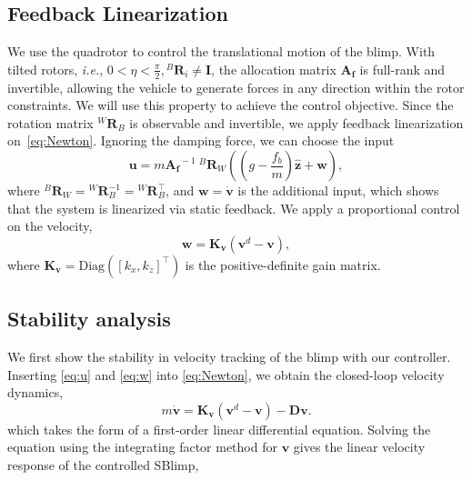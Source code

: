 \documentclass[conference]{ieeeconf}
\begin{document}
\subsection{Feedback Linearization}
We use the quadrotor to control the translational motion of the blimp.
With tilted rotors, \textit{i.e.}, $0<\eta<\frac{\pi}{2}, {}^{B}\!\boldsymbol{R}_{i}\neq\boldsymbol{I}$, the allocation matrix $\boldsymbol{A_f}$ is full-rank and invertible, allowing the vehicle to generate forces in any direction within the rotor constraints. We will use this property to achieve the control objective. 
Since the rotation matrix ${}^W\!\!\boldsymbol{R}\!_B$ is observable and invertible, we apply feedback linearization on~\ref{eq:Newton}. Ignoring the damping force, we can choose the input
\begin{equation}
    \boldsymbol{u} = m\boldsymbol{A_f}^{\!\!\!-1}\:{}^B\!\boldsymbol{R}_{\!W}\left(\left(g-\frac{f_{b}}{m}\right)\boldsymbol{\hat z} + \boldsymbol{w}\right),
    \label{eq:u}
\end{equation}
where ${}^B\!\boldsymbol{R}_{\!W} = {}^W\!\!\boldsymbol{R}_{\!B}^{-1} = {}^W\!\!\boldsymbol{R}_{\!B}^{\top}$, and $\boldsymbol{w} = \boldsymbol{\dot v}$ is the additional input, which shows that the system is linearized via static feedback. We apply a proportional control on the velocity,
\begin{equation}
    \boldsymbol{w} = 
    \boldsymbol{K_{v}}\left(\boldsymbol{v}^d - \boldsymbol{v}\right),
    \label{eq:w}
\end{equation}
where $\boldsymbol{K_{v}} = \text{Diag}\left(\left[k_{\dot x}, k_{\dot z}\right]^\top\right)$ is the positive-definite gain matrix. 

\subsection{Stability analysis}
We first show the stability in velocity tracking of the blimp with our controller. Inserting \eqref{eq:u} and \eqref{eq:w} into \eqref{eq:Newton}, we obtain the closed-loop velocity dynamics, 
\begin{equation}
    m\boldsymbol{\dot v} = \boldsymbol{K_{v}}\left(\boldsymbol{v}^d - \boldsymbol{v}\right) - \boldsymbol{D}\boldsymbol{v}.
    \label{eq:2DposDynamics}
\end{equation}
which takes the form of a first-order linear differential equation. Solving the equation using the integrating factor method for $\boldsymbol{v}$ gives the linear velocity response of the controlled SBlimp,
\end{document}
